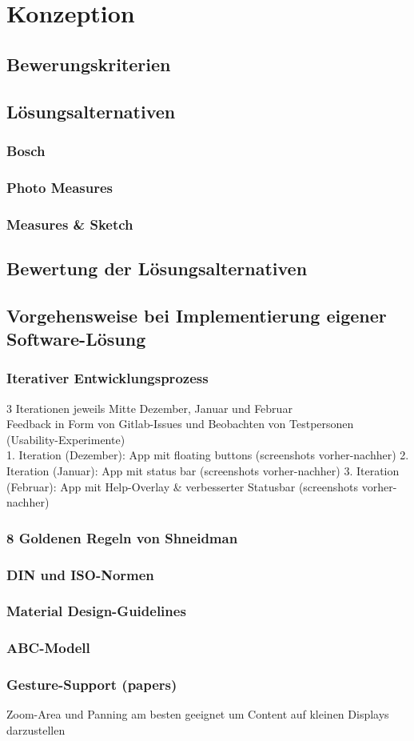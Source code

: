 \chapter{Konzeption}
\section{Bewerungskriterien}
\section{Lösungsalternativen}
  \subsection{Bosch}
  \subsection{Photo Measures}
  \subsection{Measures \& Sketch}
\section{Bewertung der Lösungsalternativen}
\section{Vorgehensweise bei Implementierung eigener Software-Lösung}
  \subsection{Iterativer Entwicklungsprozess}
    3 Iterationen jeweils Mitte Dezember, Januar und Februar \\
    Feedback in Form von Gitlab-Issues und Beobachten von Testpersonen (Usability-Experimente) \\
    1. Iteration (Dezember): App mit floating buttons (screenshots vorher-nachher)
    2. Iteration (Januar): App mit status bar (screenshots vorher-nachher)
    3. Iteration (Februar): App mit Help-Overlay \& verbesserter Statusbar (screenshots vorher-nachher)
  \subsection{8 Goldenen Regeln von Shneidman}
  \subsection{DIN und ISO-Normen}
  \subsection{Material Design-Guidelines}
  \subsection{ABC-Modell}
  \subsection{Gesture-Support (papers)}
    Zoom-Area und Panning am besten geeignet um Content auf kleinen Displays darzustellen \\


  
